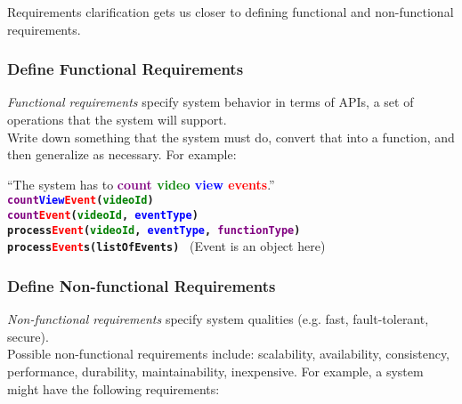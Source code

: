 \documentclass[12pt, titlepage]{article}
\newcommand{\textbt}[1]{\textbf{\texttt{#1}}}
\begin{document}
Requirements clarification gets us closer to defining functional and non-functional requirements.

\subsubsection{Define Functional Requirements}

\textit{Functional requirements} specify system behavior in terms of APIs, a set of operations that the system will support. \\

Write down something that the system must do, convert that into a function, and then generalize as necessary. For example: \\

\begin{adjustwidth}{2em}{0em}

``The system has to \textbf{\textcolor{purple}{count} \textcolor{green}{video} \textcolor{blue}{view} \textcolor{red}{events}}.'' \\

\textbt{\textcolor{purple}{count}\textcolor{blue}{View}\textcolor{red}{Event}(\textcolor{green}{videoId})} \\

\textbt{\textcolor{purple}{count}\textcolor{red}{Event}(\textcolor{green}{videoId}, \textcolor{blue}{eventType})} \\

\textbt{process\textcolor{red}{Event}(\textcolor{green}{videoId}, \textcolor{blue}{eventType}, \textcolor{purple}{functionType})} \\

  \textbt{process\textcolor{red}{Event}s(listOfEvents)} \ (Event is an object here)

\end{adjustwidth}

\subsubsection{Define Non-functional Requirements}

\textit{Non-functional requirements} specify system qualities (e.g. fast, fault-tolerant, secure). \\

Possible non-functional requirements include: scalability, availability, consistency, performance, durability, maintainability, inexpensive. For example, a system might have the following requirements:
\end{document}
